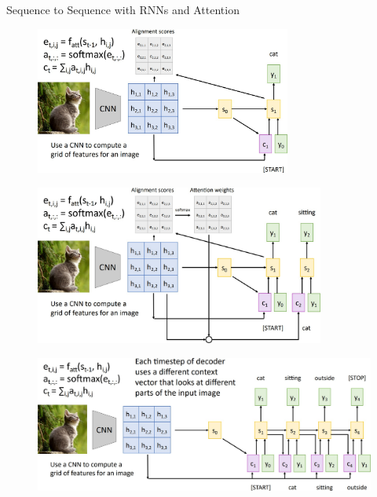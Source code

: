 \begin{frame}[allowframebreaks]{Sequence to Sequence with RNNs and Attention}
    \framebreak

    \begin{figure}
        \flushleft
        \includegraphics[width=0.75\textwidth,keepaspectratio]{images/rnn/slide_30_1_img.jpg}
    \end{figure}

    \framebreak

    \begin{figure}
        \flushleft
        \includegraphics[width=0.85\textwidth,keepaspectratio]{images/rnn/slide_31_1_img.jpg}
    \end{figure}

    \framebreak

    \begin{figure}
        \centering
        \includegraphics[width=1\textwidth,keepaspectratio]{images/rnn/slide_32_1_img.jpg}
    \end{figure}


\end{frame}

